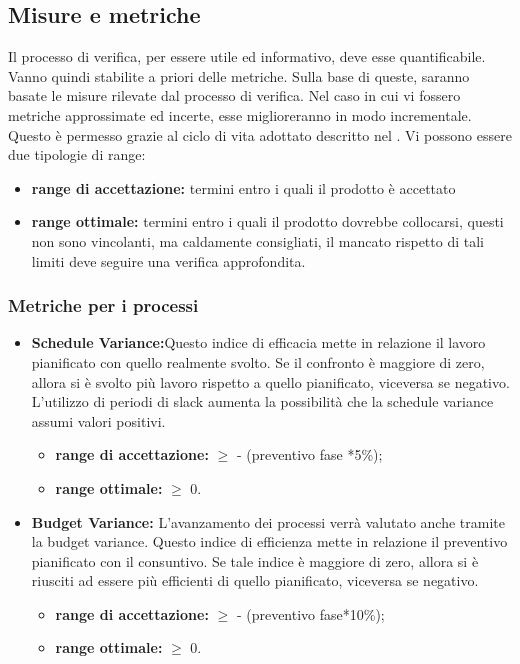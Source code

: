 	\subsection{Misure e metriche}
	Il processo di verifica, per essere utile ed informativo, deve esse quantificabile. Vanno
quindi stabilite a priori delle metriche. Sulla base di queste, saranno basate le misure
rilevate dal processo di verifica. Nel caso in cui vi fossero metriche approssimate ed incerte,
esse miglioreranno in modo incrementale. Questo è permesso grazie al ciclo di vita adottato
descritto nel \docNameVersionPdP. Vi possono essere due tipologie di range:
\begin{itemize}
	\item \textbf{range di accettazione:} termini entro i quali il prodotto è accettato
	\item \textbf{range ottimale:} termini entro i quali il prodotto dovrebbe collocarsi, questi non sono vincolanti, ma caldamente consigliati, il mancato rispetto di tali limiti deve seguire una verifica approfondita. 
\end{itemize}
	\subsubsection{Metriche per i processi}
		\begin{itemize}
		
			\item \textbf{Schedule Variance:}Questo indice di efficacia mette in relazione il lavoro pianificato con quello realmente svolto. Se il confronto è maggiore di zero, allora si è svolto più lavoro rispetto a quello pianificato, viceversa se negativo. L'utilizzo di periodi di slack aumenta la possibilità che la schedule variance assumi valori positivi.
			\begin{itemize}
				\item \textbf{range di accettazione:} $\geq$ - (preventivo fase *5\%);
				\item \textbf{range ottimale:} $\geq$ 0.
			\end{itemize}
			\item \textbf{Budget Variance:} L'avanzamento dei processi verrà valutato anche tramite la budget variance. Questo indice di efficienza mette in relazione il preventivo pianificato con il consuntivo. Se tale indice è maggiore di zero, allora si è riusciti ad essere più efficienti di quello pianificato, viceversa se negativo.
			\begin{itemize}
				\item \textbf{range di accettazione:} $\geq$ - (preventivo fase*10\%);
				\item \textbf{range ottimale:} $\geq$ 0.
			\end{itemize}
		\end{itemize}


